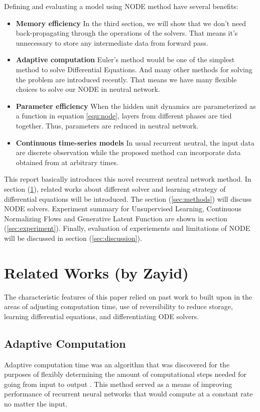 \documentclass{article}
\begin{document}
Defining and evaluating a model using NODE method have several benefits:
\begin{itemize}
    \item \textbf{Memory efficiency} In the third section, we will show that we don't need back-propagating through the operations of the solvers. That means it's unnecessary to store any intermediate data from forward pass. 
    
    \item \textbf{Adaptive computation} Euler's method would be one of the simplest method to solve Differential Equations. And many other methods for solving the problem are introduced recently\cite{Runge1895UeberDifferentialgleichungen, Shampine1987SolvingProblems}. That means we have many flexible choices to solve our NODE in neutral network.
    
    \item \textbf{Parameter efficiency} When the hidden unit dynamics are parameterized as a function in equation \ref{equ:node}, layers from different phases are tied together. Thus, parameters are reduced in neutral network.
    
    \item \textbf{Continuous time-series models} In usual recurrent neutral, the input data are discrete observation while the proposed method can incorporate data obtained from at arbitrary times.
\end{itemize}

This report basically introduces this novel recurrent neutral network method. In section (\ref{sec:related-work}), related works about different solver and learning strategy of differential equations will be introduced. The section (\ref{sec:methods}) will discuss NODE solvers. Experiment summary for Unsupervised Learning, Continuous Normalizing Flows and Generative Latent Function are shown in section (\ref{sec:experiment}). Finally, evaluation of experiements and limitations of NODE will be discussed in section (\ref{sec:discussion}).

\section{Related Works (by Zayid)}
\label{sec:related-work}
The characteristic features of this paper relied on past work to built upon in the areas of adjusting computation time, use of reversibility to reduce storage, learning differential equations, and differentiating ODE solvers. 
\subsection{Adaptive Computation}
Adaptive computation time was an algorithm that was discovered for the purposes of flexibly determining the amount of computational steps needed for going from input to output \cite{graves2016adaptive,jernite2016variable,figurnov2017spatially,chang2018reversible}. This method served as a means of improving performance of recurrent neural networks that would compute at a constant rate no matter the input.
\end{document}
